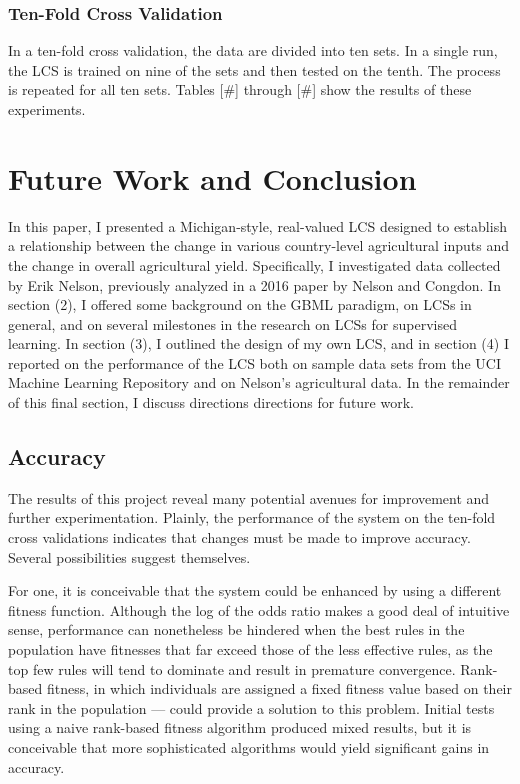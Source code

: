 \documentclass[11pt]{article}
\begin{document}
\subsubsection{Ten-Fold Cross Validation}

In a ten-fold cross validation, the data are divided into ten sets. In a single run, the LCS is trained on nine of the sets and then tested on the tenth. The process is repeated for all ten sets. Tables [\#] through [\#] show the results of these experiments.

\section{Future Work and Conclusion}

In this paper, I presented a Michigan-style, real-valued LCS designed to establish a relationship between the change in various country-level agricultural inputs and the change in overall agricultural yield. Specifically, I investigated data collected by Erik Nelson, previously analyzed in a 2016 paper by Nelson and Congdon. In section (2), I offered some background on the GBML paradigm, on LCSs in general, and on several milestones in the research on LCSs for supervised learning. In section (3), I outlined the design of my own LCS, and in section (4) I reported on the performance of the LCS both on sample data sets from the UCI Machine Learning Repository and on Nelson's agricultural data. In the remainder of this final section, I discuss directions directions for future work.

\subsection{Accuracy}
The results of this project reveal many potential avenues for improvement and further experimentation. Plainly, the performance of the system on the ten-fold cross validations indicates that changes must be made to improve accuracy. Several possibilities suggest themselves. 

For one, it is conceivable that the system could be enhanced by using a different fitness function. Although the log of the odds ratio makes a good deal of intuitive sense, performance can nonetheless be hindered when the best rules in the population have fitnesses that far exceed those of the less effective rules, as the top few rules will tend to dominate and result in premature convergence. Rank-based fitness, in which individuals are assigned a fixed fitness value based on their rank in the population --- could provide a solution to this problem. Initial tests using a naive rank-based fitness algorithm produced mixed results, but it is conceivable that more sophisticated algorithms would yield significant gains in accuracy.
\end{document}
